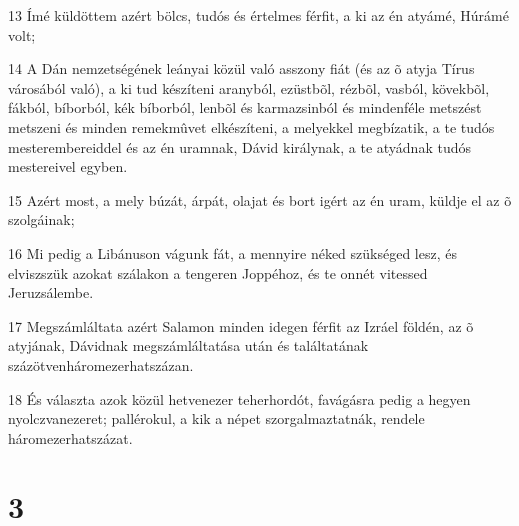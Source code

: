 \par 13 Ímé küldöttem azért bölcs, tudós és értelmes férfit, a ki az én atyámé, Húrámé volt;
\par 14 A Dán nemzetségének leányai közül való asszony fiát (és az õ atyja Tírus városából való), a ki tud készíteni aranyból, ezüstbõl, rézbõl, vasból, kövekbõl, fákból, bíborból, kék bíborból, lenbõl és karmazsinból és mindenféle metszést metszeni és minden remekmûvet elkészíteni, a melyekkel megbízatik, a te tudós mesterembereiddel és az én uramnak, Dávid királynak, a te atyádnak tudós mestereivel egyben.
\par 15 Azért most, a mely búzát, árpát, olajat és bort igért az én uram, küldje el az õ szolgáinak;
\par 16 Mi pedig a Libánuson vágunk fát, a mennyire néked szükséged lesz, és elviszszük azokat szálakon a tengeren Joppéhoz, és te onnét vitessed Jeruzsálembe.
\par 17 Megszámláltata azért Salamon minden idegen férfit az Izráel földén, az õ atyjának, Dávidnak  megszámláltatása után és találtatának százötvenháromezerhatszázan.
\par 18 És választa azok közül hetvenezer teherhordót, favágásra pedig a hegyen nyolczvanezeret; pallérokul, a kik a népet szorgalmaztatnák, rendele háromezerhatszázat.

\chapter{3}

